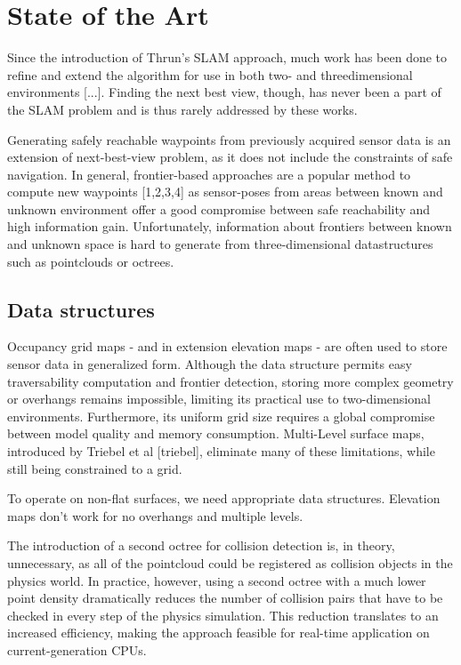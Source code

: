 \documentclass[a4paper, 10pt, conference]{ieeeconf}        %
\begin{document}
\section{State of the Art}

Since the introduction of Thrun's SLAM approach, much work has been done to refine and extend the algorithm for use in both two- and threedimensional environments [...]. Finding the next best view, though, has never been a part of the SLAM problem and is thus rarely addressed by these works.

Generating safely reachable waypoints from previously acquired sensor data is an extension of next-best-view problem, as it does not include the constraints of safe navigation. In general, frontier-based approaches are a popular method to compute new waypoints [1,2,3,4] as sensor-poses from areas between known and unknown environment offer a good compromise between safe reachability and high information gain. Unfortunately, information about frontiers between known and unknown space is hard to generate from three-dimensional datastructures such as pointclouds or octrees.

\subsection{Data structures}

Occupancy grid maps - and in extension elevation maps - are often used to store sensor data in generalized form. Although the data structure permits easy traversability computation and frontier detection, storing more complex geometry or overhangs remains impossible, limiting its practical use to two-dimensional environments. Furthermore, its uniform grid size requires a global compromise between model quality and memory consumption. Multi-Level surface maps, introduced by Triebel et al [triebel], eliminate many of these limitations, while still being constrained to a grid.

To operate on non-flat surfaces, we need appropriate data structures. Elevation maps don't work for no overhangs and multiple levels.

The introduction of a second octree for collision detection is, in theory, unnecessary, as all of the pointcloud could be registered as collision objects in the physics world. In practice, however, using a second octree with a much lower point density dramatically reduces the number of collision pairs that have to be checked in every step of the physics simulation. This reduction translates to an increased efficiency, making the approach feasible for real-time application on current-generation CPUs.
\end{document}
